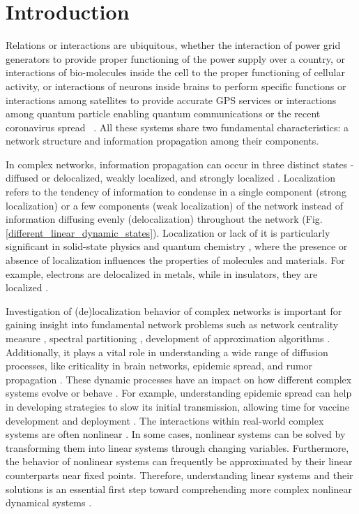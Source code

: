 \documentclass[aps, prd, showpacs, floatfix, superscriptaddress, twocolumn, nofootinbib, preprintnumbers, longbibliography]{revtex4-2}
\begin{document}
\section{Introduction}
\label{Sec:Intro}
Relations or interactions are ubiquitous, whether the interaction of power grid generators to provide proper functioning of the power supply over a country, or interactions of bio-molecules inside the cell to the proper functioning of cellular activity, or interactions of neurons inside brains to perform specific functions or interactions among satellites to provide accurate GPS services or interactions among quantum particle enabling quantum communications or the recent coronavirus spread ~\cite{revStrogatz2001, dynamicreconfig2011, quantuminternet, GPSnetwork, COVID19}. All these systems share two fundamental characteristics: a network structure and information propagation among their components.

In complex networks, information propagation can occur in three distinct states - diffused or delocalized, weakly localized, and strongly localized \cite{filoche2012universal}. Localization refers to the tendency of information to condense in a single component (strong localization) or a few components (weak localization) of the network instead of information diffusing evenly (delocalization) throughout the network (Fig. \ref{different_linear_dynamic_states}). Localization or lack of it is particularly significant in solid-state physics and quantum chemistry \cite{elsner1999anderson}, where the presence or absence of localization influences the properties of molecules and materials. For example, electrons are delocalized in metals, while in insulators, they are localized \cite{elsner1999anderson}.

Investigation of (de)localization behavior of complex networks is important for gaining insight into fundamental network problems such as network centrality measure \cite{pradhan2020principal}, spectral partitioning \cite{zhang2016robust}, development of approximation algorithms \cite{gleich2015using}. Additionally, it plays a vital role in understanding a wide range of diffusion processes, like criticality in brain networks, epidemic spread, and rumor propagation \cite{loc2020spectra, revdynamicalprocess2012}. These dynamic processes have an impact on how different complex systems evolve or behave \cite{revdynamicalprocess2012}. For example, understanding epidemic spread can help in developing strategies to slow its initial transmission, allowing time for vaccine development and deployment \cite{diseasespreading2004, pandemicinfluenza2005, urbanizationhantavirus2018, urbanizationinfluenza2018, jalan2020wheel}. The interactions within real-world complex systems are often nonlinear \cite{strogatz2018nonlinear}. In some cases, nonlinear systems can be solved by transforming them into linear systems through changing variables. Furthermore, the behavior of nonlinear systems can frequently be approximated by their linear counterparts near fixed points. Therefore, understanding linear systems and their solutions is an essential first step toward comprehending more complex nonlinear dynamical systems \cite{strogatz2018nonlinear}.
\end{document}
